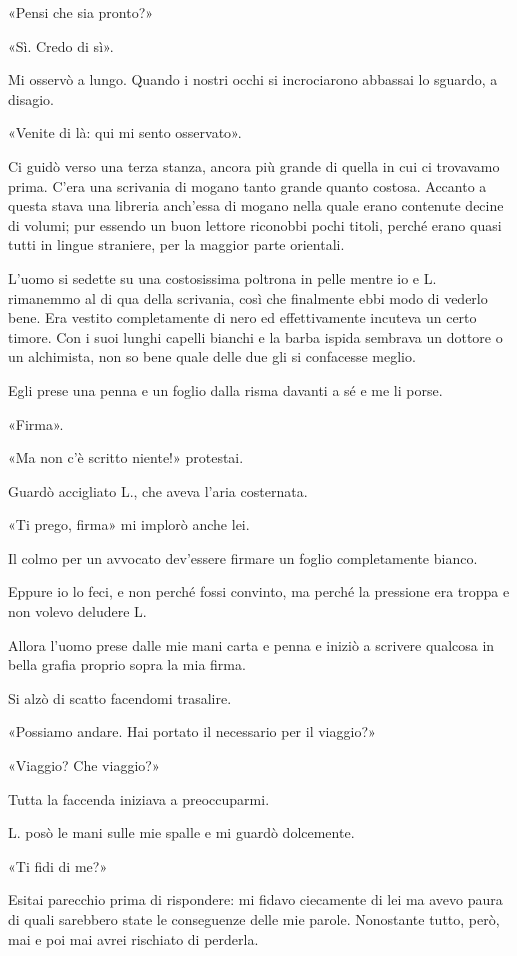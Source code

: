 «Pensi che sia pronto?»

«Sì. Credo di sì».

Mi osservò a lungo. Quando i nostri occhi si incrociarono abbassai lo sguardo, a disagio.

«Venite di là: qui mi sento osservato».

Ci guidò verso una terza stanza, ancora più grande di quella in cui ci trovavamo prima. C'era una
scrivania di mogano tanto grande quanto costosa. Accanto a questa stava una libreria anch'essa di
mogano nella quale erano contenute decine di volumi; pur essendo un buon lettore riconobbi pochi
titoli, perché erano quasi tutti in lingue straniere, per la maggior parte orientali.

L'uomo si sedette su una costosissima poltrona in pelle mentre io e L. rimanemmo al di qua della
scrivania, così che finalmente ebbi modo di vederlo bene. Era vestito completamente di nero ed
effettivamente incuteva un certo timore. Con i suoi lunghi capelli bianchi e la barba ispida
sembrava un dottore o un alchimista, non so bene quale delle due gli si confacesse meglio.

Egli prese una penna e un foglio dalla risma davanti a sé e me li porse.

«Firma».

«Ma non c'è scritto niente!» protestai.

Guardò accigliato L., che aveva l'aria costernata.

«Ti prego, firma» mi implorò anche lei.

Il colmo per un avvocato dev'essere firmare un foglio completamente bianco.

Eppure io lo feci, e non perché fossi convinto, ma perché la pressione era troppa e non volevo
deludere L.

Allora l'uomo prese dalle mie mani carta e penna e iniziò a scrivere qualcosa in bella grafia
proprio sopra la mia firma.

Si alzò di scatto facendomi trasalire.

«Possiamo andare. Hai portato il necessario per il viaggio?»

«Viaggio? Che viaggio?»

Tutta la faccenda iniziava a preoccuparmi.

L. posò le mani sulle mie spalle e mi guardò dolcemente.

«Ti fidi di me?»

Esitai parecchio prima di rispondere: mi fidavo ciecamente di lei ma avevo paura di quali sarebbero
state le conseguenze delle mie parole. Nonostante tutto, però, mai e poi mai avrei rischiato di
perderla.

